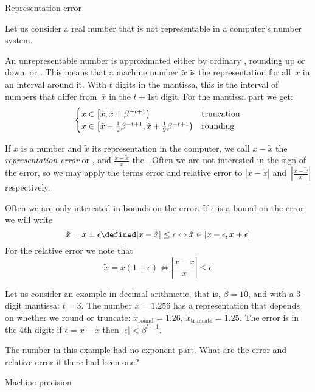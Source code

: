  {Representation error}

Let us consider a real number that is not representable in a
computer's number system.

An unrepresentable number is approximated either by
ordinary , rounding up or down, or .
This means that a machine number~$\tilde x$ is the representation for
all~$x$ in an interval around it.  With $t$ digits in the
mantissa, this is the interval of numbers that differ
from~$\bar x$ in the $t+1$st digit. For the mantissa
part we get:
\[
\begin{cases}
  x\in \left[\tilde x,\tilde x+\beta^{-t+1}\right)&\hbox{truncation}\\
  x\in \left[\tilde x-\frac12 \beta^{-t+1},\tilde x+\frac12 \beta^{-t+1}\right)
    &\hbox{rounding}
\end{cases}
\]

If $x$ is a number and $\tilde x$ its representation in the computer,
we call $x-\tilde x$ the \emph{representation error} or
, and $\frac{x-\tilde x}{x}$
the . Often we are not
interested in the sign of the error, so we may apply the terms error
and relative error to $|x-\tilde x|$ and~$|\frac{x-\tilde x}{x}|$
respectively.

Often we are only interested in bounds on the error. If $\epsilon$ is
a bound on the error, we will write
\[ \tilde x = x\pm\epsilon \defined
    |x-\tilde x|\leq\epsilon 
    \Leftrightarrow \tilde x\in[x-\epsilon,x+\epsilon]
\]
For the relative error we note that
\[ \tilde x =x(1+\epsilon) \Leftrightarrow
    \left|\frac{\tilde x-x}{x}\right|\leq \epsilon
\]

Let us consider an example in decimal arithmetic, that is, $\beta=10$,
and with a 3-digit mantissa: $t=3$.  The number $x=1.256$ has a
representation that depends on whether we round or truncate: $\tilde
x_{\mathrm{round}}=1.26$, $\tilde x_{\mathrm{truncate}}=1.25$.
The error is in the 4th digit: if $\epsilon=x-\tilde x$ 
then $|\epsilon|<\beta^{t-1}$.
\begin{exercise}
The number in this example had no exponent part. What are the error
and relative error if there had been one?
\end{exercise}

 {Machine precision}
\label{sec:machine-eps}

